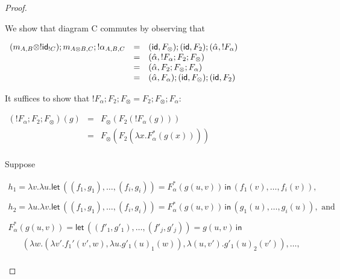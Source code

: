 \begin{proof}
\begin{report}
\begin{center}
\begin{itemize}
      \noindent
      We show that diagram C commutes by observing that
      \begin{center}
        \begin{math}
          \begin{array}{lll}
            (m_{A,B} \otimes !\mathsf{id}_{!C});m_{A\otimes B,C};!\alpha_{A,B,C}
            & = & (\mathsf{id},F_\otimes);(\mathsf{id},F_2);(\hat{\alpha},!F_\alpha)\\
            & = & (\hat{\alpha},!F_\alpha;F_2;F_\otimes)\\
            & = & (\hat{\alpha},F_2;F_\otimes;F_\alpha)\\
            & = & (\hat{\alpha},F_\alpha);(\mathsf{id},F_\otimes);(\mathsf{id},F_2)\\
          \end{array}
        \end{math}
      \end{center}
      It suffices to show that $!F_\alpha;F_2;F_\otimes = F_2;F_\otimes;F_\alpha$:
      \begin{center}
        \begin{math}
          \begin{array}{lll}
            (!F_\alpha;F_2;F_\otimes)(g)
            & = & F_\otimes(F_2(!F_\alpha(g)))\\
            & = & F_\otimes(F_2(\lambda x.F^*_\alpha(g(x))))\\
          \end{array}
        \end{math}
      \end{center}
      Suppose
      \begin{center}
        \vspace{-20px}
        \begin{math}
          \begin{array}{lll}
            h_1 = \lambda v.\lambda u.\mathsf{let}\,((f_1,g_1),\ldots,(f_i,g_i)) = F^*_\alpha(g(u,v))\,\mathsf{in}\,
            (f_1(v),\ldots,f_i(v)),\\
            \\
            h_2 = \lambda u.\lambda v.\mathsf{let}\,((f_1,g_1),\ldots,(f_i,g_i)) = F^*_\alpha(g(u,v)) \,\mathsf{in}\,
           (g_1(u),\ldots,g_i(u)), \text{ and }\\
           \\
           F^*_\alpha(g(u,v)) = \mathsf{let}\, ((f'_1,g'_1),\ldots,(f'_j,g'_j)) = g(u,v) \,\mathsf{in}\,\\
      \,\,\,\,\,\,\,\,\,\,(\lambda w.(\lambda v'.f_1'(v',w),\lambda u.g'_1(u)_1(w)),\lambda (u,v').g'_1(u)_2(v')),\ldots,\\

\end{array}
\end{math}
\end{center}
\end{itemize}
\end{center}
\end{report}
\end{proof}
